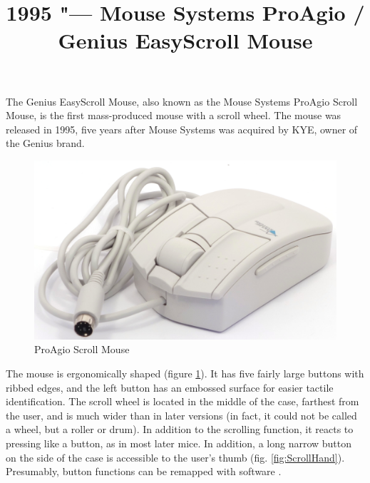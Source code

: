 \documentclass[11pt, a4paper]{article}
\begin{document}
\title{1995 "--- Mouse Systems ProAgio / Genius EasyScroll Mouse}
\date{}
\maketitle
{}
The Genius EasyScroll Mouse, also known as the Mouse Systems ProAgio Scroll Mouse, is the first mass-produced mouse with a scroll wheel. The mouse was released in 1995, five years after Mouse Systems was acquired by KYE, owner of the Genius brand.

\begin{figure}[h]
    \centering
    \includegraphics[scale=0.5]{1995_pro_agio_scroll_mouse/pic_30.jpg}
    \caption{ProAgio Scroll Mouse}
    \label{fig:ScrollPic}
\end{figure}


The mouse is ergonomically shaped (figure \ref{fig:ScrollPic}). It has five fairly large buttons with ribbed edges, and the left button has an embossed surface for easier tactile identification. The scroll wheel is located in the middle of the case, farthest from the user, and is much wider than in later versions (in fact, it could not be called a wheel, but a roller or drum). In addition to the scrolling function, it reacts to pressing like a button, as in most later mice. In addition, a long narrow button on the side of the case is accessible to the user's thumb (fig. \ref{fig:ScrollHand}). Presumably, button functions can be remapped with software \cite{yt}.
\end{document}
